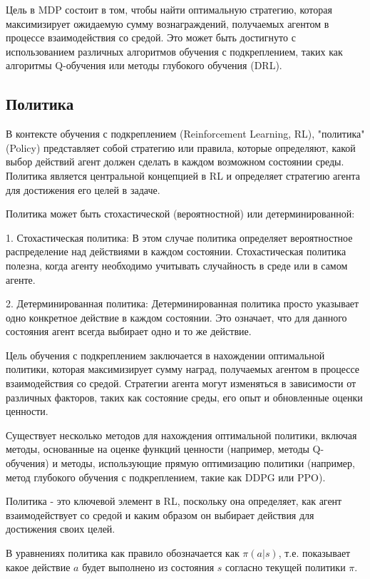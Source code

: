Цель в MDP состоит в том, чтобы найти оптимальную стратегию, которая максимизирует ожидаемую сумму вознаграждений, получаемых агентом в процессе взаимодействия со средой. Это может быть достигнуто с использованием различных алгоритмов обучения с подкреплением, таких как алгоритмы Q-обучения или методы глубокого обучения (DRL).


\subsection{Политика}
В контексте обучения с подкреплением (Reinforcement Learning, RL), "политика" (Policy) представляет собой стратегию или правила, которые определяют, какой выбор действий агент должен сделать в каждом возможном состоянии среды. Политика является центральной концепцией в RL и определяет стратегию агента для достижения его целей в задаче.

Политика может быть стохастической (вероятностной) или детерминированной:

1. Стохастическая политика: В этом случае политика определяет вероятностное распределение над действиями в каждом состоянии. Стохастическая политика полезна, когда агенту необходимо учитывать случайность в среде или в самом агенте.

2. Детерминированная политика: Детерминированная политика просто указывает одно конкретное действие в каждом состоянии. Это означает, что для данного состояния агент всегда выбирает одно и то же действие.

Цель обучения с подкреплением заключается в нахождении оптимальной политики, которая максимизирует сумму наград, получаемых агентом в процессе взаимодействия со средой. Стратегии агента могут изменяться в зависимости от различных факторов, таких как состояние среды, его опыт и обновленные оценки ценности.

Существует несколько методов для нахождения оптимальной политики, включая методы, основанные на оценке функций ценности (например, методы Q-обучения) и методы, использующие прямую оптимизацию политики (например, метод глубокого обучения с подкреплением, такие как DDPG или PPO).

Политика - это ключевой элемент в RL, поскольку она определяет, как агент взаимодействует со средой и каким образом он выбирает действия для достижения своих целей.

В уравнениях политика как правило обозначается как $\pi(a|s)$, т.е. показывает какое действие $a$ будет выполнено из состояния $s$ согласно текущей политики $\pi$.

